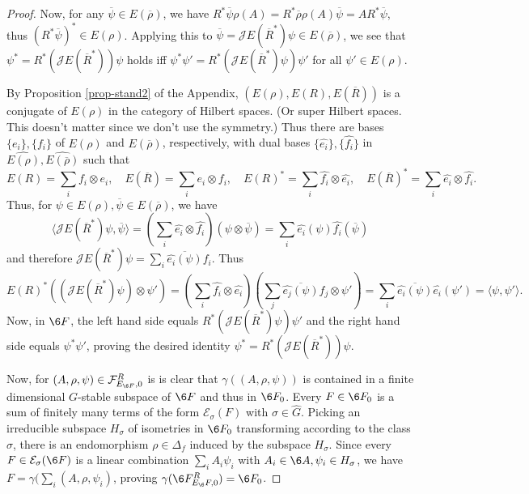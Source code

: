 \documentclass[12pt]{article}
\theoremstyle{definition}
\theoremstyle{definition}
\theoremstyle{remark}
\def\2#1{{\mathcal #1}}
\def\ol#1{{\overline #1}}
\begin{document}
\begin{proof}
Now, for any $\ol{\psi}\in E(\ol{\rho})$, we have
$R^*\ol{\psi}\rho(A)=R^*\ol{\rho}\rho(A)\ol{\psi}=AR^*\ol{\psi}$, 
thus $(R^*\ol{\psi})^*\in E(\rho)$. Applying this to
$\ol{\psi}=\2JE(\overline{R}^*)\psi\in E(\ol{\rho})$, we see that 
$\psi^*=R^*(\2JE(\overline{R}^*))\psi$ holds iff
$\psi^*\psi'=R^*(\2JE(\overline{R}^*)\psi)\psi'$ for all $\psi'\in E(\rho)$.

By Proposition \ref{prop-stand2} of the Appendix, $(E(\rho),E(R),E(\ol{R}))$ is a conjugate of
$E(\rho)$ in the category of Hilbert spaces. (Or super Hilbert spaces. This doesn't matter since we
don't use the symmetry.) Thus there are bases $\{e_i\},\{f_i\}$ of $E(\rho)$ and $E(\ol{\rho})$,
respectively, with dual bases $\{\widehat{e_i}\},\{\widehat{f_i}\}$ in
$\widehat{E(\rho)},\widehat{E(\ol{\rho})}$ such that  
\[ E(R) = \sum_i f_i\otimes e_i, \quad E(\ol{R})=\sum_i e_i\otimes f_i, \quad 
  E(R)^* = \sum_i \widehat{f_i}\otimes\widehat{e_i}, \quad E(\ol{R})^*=\sum_i\widehat{e_i}\otimes\widehat{f_i}.
\]
Thus, for $\psi\in E(\rho),\ol{\psi}\in E(\ol{\rho})$, we have
\[ \langle\2JE(\ol{R}^*)\psi,\ol{\psi}\rangle
   =\left(\sum_i\widehat{e_i}\otimes\widehat{f_i}\right)(\psi\otimes\ol{\psi})
   =\sum_i \widehat{e_i}(\psi)\widehat{f_i}(\ol{\psi})
\]
and therefore $\2JE(\ol{R}^*)\psi=\sum_i\overline{ {\widehat{e_i}(\psi)}} f_i$. Thus
\[ E(R)^*((\2JE(\ol{R}^*)\psi)\otimes\psi')=(\sum_i\widehat{f_i}\otimes\widehat{e_i})(
   \sum_j\ol{  {\widehat{e_j}(\psi)}}f_j\otimes\psi')=\sum_i\ol{ {\widehat{e_i}(\psi)}}\widehat{e_i}(\psi')
  =\langle\psi,\psi'\rangle.
\]
Now, in $\6F$, the left hand side equals $R^*(\2JE(\ol{R}^*)\psi)\psi'$ and the right hand side
equals $\psi^*\psi'$, proving the desired identity $\psi^*=R^*(\2JE(\overline{R}^*))\psi$.

Now, for $(A,\rho,\psi)\in \2F^R_{E_{\6F},0}$ is is clear that $\gamma((A,\rho,\psi))$ is contained
in a finite dimensional $G$-stable subspace of $\6F$ and thus in $\6F_0$. Every $F\in\6F_0$ is a sum
of finitely many terms of the form $\2E_\sigma(F)$ with $\sigma\in\widehat{G}$. Picking an
irreducible subspace $H_\sigma$ of isometries in $\6F_0$ transforming according to the class
$\sigma$, there is an endomorphism $\rho\in\Delta_f$ induced by the subspace $H_\sigma$. 
Since every $F\in \2E_\sigma(\6F)$ is a linear combination $\sum_i A_i\psi_i$ with 
$A_i\in\6A, \psi_i\in H_\sigma$, we have $F=\gamma(\sum_i(A,\rho,\psi_i)$, proving
$\gamma(\6F^R_{E_\6F,0})=\6F_0$. 


\end{proof}
\end{document}
